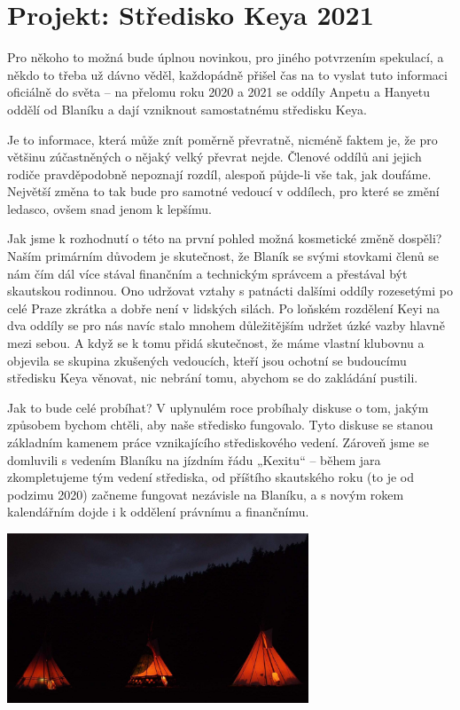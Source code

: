 \chapter{Projekt: Středisko Keya 2021} %
\label{cha:projekt_středisko_keya_2021}

Pro někoho to možná bude úplnou novinkou, pro jiného potvrzením spekulací, a někdo to třeba už dávno věděl, každopádně přišel čas na to vyslat tuto informaci oficiálně do světa – na přelomu roku 2020 a 2021 se oddíly Anpetu a Hanyetu oddělí od Blaníku a dají vzniknout samostatnému středisku Keya.

Je to informace, která může znít poměrně převratně, nicméně faktem je, že pro většinu zúčastněných o nějaký velký převrat nejde. Členové oddílů ani jejich rodiče pravděpodobně nepoznají rozdíl, alespoň půjde-li vše tak, jak doufáme. Největší změna to tak bude pro samotné vedoucí v oddílech, pro které se změní ledasco, ovšem snad jenom k lepšímu.

Jak jsme k rozhodnutí o této na první pohled možná kosmetické změně dospěli? Naším primárním důvodem je skutečnost, že Blaník se svými stovkami členů se nám čím dál více stával finančním a technickým správcem a přestával být skautskou rodinnou. Ono udržovat vztahy s patnácti dalšími oddíly rozesetými po celé Praze zkrátka a dobře není v lidských silách. Po loňském rozdělení Keyi na dva oddíly se pro nás navíc stalo mnohem důležitějším udržet úzké vazby hlavně mezi sebou. A když se k tomu přidá skutečnost, že máme vlastní klubovnu a objevila se skupina zkušených vedoucích, kteří jsou ochotní se budoucímu středisku Keya věnovat, nic nebrání tomu, abychom se do zakládání pustili.

Jak to bude celé probíhat? V uplynulém roce probíhaly diskuse o tom, jakým způsobem bychom chtěli, aby naše středisko fungovalo. Tyto diskuse se stanou základním kamenem práce vznikajícího střediskového vedení. Zároveň jsme se domluvili s vedením Blaníku na jízdním řádu „Kexitu“ – během jara zkompletujeme tým vedení střediska, od příštího skautského roku (to je od podzimu 2020) začneme fungovat nezávisle na Blaníku, a s novým rokem kalendářním dojde i k oddělení právnímu a finančnímu.

\begin{center}
\includegraphics[width=9cm]{img/udo_clanky/fikuv_clanek_stredisko.jpg}
\end{center}

